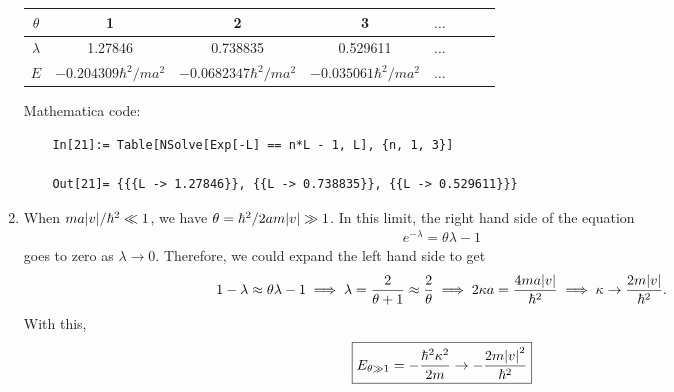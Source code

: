 \documentclass{article}
\theoremstyle{definition}
\newcommand{\f}[2]{\frac{#1}{#2}}
\begin{document}
\begin{enumerate}[label=(\alph*)]
	\begin{center}
		\begin{tabular}{|c|c|c|c|c|c|c|c|}
			\hline
			$\theta$ & 1 & 2 &3 &$\dots$ \\
			\hline
			$\lambda$ &1.27846&0.738835&0.529611&$\dots$    \\
			\hline
			$E$      &$-0.204309 \hbar^2/ma^2$ &$-0.0682347\hbar^2/ma^2$& $-0.035061\hbar^2/ma^2$ & $\dots$ \\ 
			\hline
		\end{tabular}
	\end{center}
 	Mathematica code:
 	\begin{lstlisting}
 	In[21]:= Table[NSolve[Exp[-L] == n*L - 1, L], {n, 1, 3}]
 	
 	Out[21]= {{{L -> 1.27846}}, {{L -> 0.738835}}, {{L -> 0.529611}}}
 	\end{lstlisting}
 	
 	
 	
	\item When $ma\abs{v}/\hbar^2 \ll 1$, we have $\theta = \hbar^2/2am\abs{v} \gg 1$. In this limit, the right hand side of the equation 
	\begin{align*}
	e^{-\lambda } = \theta \lambda - 1
	\end{align*}
	goes to zero as $\lambda \to 0$. Therefore, we could expand the left hand side to get 
	\begin{align*}
	1 - \lambda \approx \theta \lambda - 1 \implies \lambda = \f{2}{\theta + 1} \approx \f{2}{\theta} \implies 2\kappa a = \f{4ma\abs{v}}{\hbar^2} \implies \kappa \to \f{2m\abs{v}}{\hbar^2}.
	\end{align*}
	With this, 
	\begin{align*}
	\boxed{E_{\theta \gg 1} = -\f{\hbar^2\kappa^2}{2m} \to -\f{2m\abs{v}^2}{\hbar^2} }
	\end{align*}
	

\end{enumerate}
\end{document}
